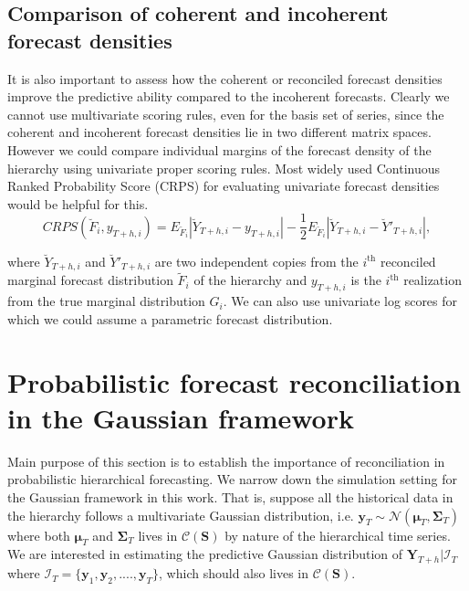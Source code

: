\documentclass[a4paper, 11pt]{article}
\begin{document}
\subsection{Comparison of coherent and incoherent forecast densities}

It is also important to assess how the coherent or reconciled forecast densities improve the predictive ability compared to the incoherent forecasts. Clearly we cannot use multivariate scoring rules, even for the basis set of series, since the coherent and incoherent forecast densities lie in two different matrix spaces.\\

\noindent
However we could compare individual margins of the forecast density of the hierarchy using univariate proper scoring rules. Most widely used Continuous Ranked Probability Score (CRPS) for evaluating univariate forecast densities would be helpful for this. \\
\begin{equation} \label{eq:(3.6)}
CRPS(\breve{F}_i,y_{T+h,i}) = E_{\breve{F}_i}|\breve{Y}_{T+h,i}-y_{T+h,i}| - \frac{1}{2}E_{\breve{F}_i}|\breve{Y}_{T+h,i}-\breve{Y}'_{T+h,i}|,
\end{equation}
       
\noindent
where $\breve{Y}_{T+h,i}$ and $\breve{Y}'_{T+h,i}$ are two independent copies from the $i^{\text{th}}$ reconciled marginal forecast distribution $\tilde{F}_i$ of the hierarchy and $y_{T+h,i}$ is the $i^{\text{th}}$ realization from the true marginal distribution $G_i$. We can also use univariate log scores for which we could assume a parametric forecast distribution.
 



\section{Probabilistic forecast reconciliation in the Gaussian framework}


Main purpose of this section is to establish the importance of reconciliation in probabilistic hierarchical forecasting. We narrow down the simulation setting for the Gaussian framework in this work. That is, suppose all the historical data in the hierarchy follows a multivariate Gaussian distribution, i.e. $\bm{y}_T \sim \mathscr{N}(\bm{\mu}_T, \bm{\Sigma}_T)$ where both $\bm{\mu}_T$ and $\bm{\Sigma}_T$ lives in $\mathscr{C}(\bm{S})$ by nature of the hierarchical time series. We are interested in estimating the predictive Gaussian distribution of $\bm{Y}_{T+h}| \bm{\mathcal{I}}_T$ where $\bm{\mathcal{I}}_T= \{\bm{y}_1,\bm{y}_2,....,\bm{y}_T\}$, which should also lives in $\mathscr{C}(\bm{S})$. \\
\end{document}

